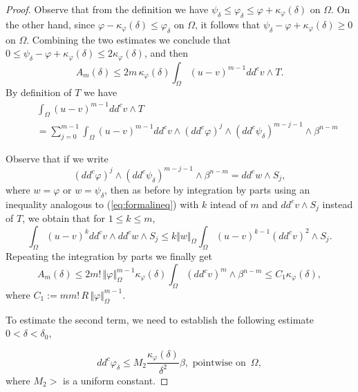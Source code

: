 \documentclass[12pt]{amsart}
\theoremstyle{definition}
\numberwithin{theorem}{section}
\numberwithin{equation}{section}
\begin{document}
{\begin{proof}
 Observe that from the definition we have  $\psi_\delta \leq \varphi_\delta  \leq \varphi + \kappa_\varphi (\delta)$ on $\Omega$. On the other hand, since $ \varphi - \kappa_\varphi (\delta) \leq \varphi_\delta$ on $\Omega$, it follows
that $ \psi_\delta - \varphi  + \kappa_\varphi  (\delta) \geq 0 $ on $\Omega$.  
Combining the two estimates  we conclude that  $0 \leq \psi_\delta - \varphi  + \kappa_\varphi  (\delta) \leq 2 \kappa_\varphi (\delta)$, and then 
$$
A_m (\delta) \leq 2 m \, \kappa_\varphi  (\delta)  \int_{\Omega}  (u - v)^{m-1} dd^c v \wedge T.
$$
By definition of $T$ we have  
\begin{eqnarray*}
&& \int_{\Omega}  (u - v)^{m-1} dd^c v \wedge T \\
 &&=   \sum_{j = 0}^{m -1} \int_{\Omega}  (u - v)^{m-1} dd^c v \wedge  (dd^c \varphi)^j \wedge (dd^c \psi_\delta)^{m-j-1} \wedge\beta^{n - m}
\end{eqnarray*}

Observe that  if we write 
$$
  (dd^c \varphi)^j \wedge (dd^c \psi_\delta)^{m-j-1} \wedge\beta^{n - m} = dd^c w \wedge S_j, 
  $$ 
  where $w = \varphi$ or $w = \psi_\delta$,  then as before by integration by parts  using an inequality analogous to (\ref {eq:formalineq}) with $k$ intead of $m$ and $ dd^c v \wedge S_j$ instead of $T$, we obtain that  for $1 \leq k \leq m$, 
$$
\int_{\Omega}  (u - v)^{k} dd^c v \wedge  dd^c w \wedge S_j \leq k  \Vert w \Vert_{\Omega} \int_{\Omega}  (u - v)^{k-1} (dd^c v)^2 \wedge S_j.
$$
Repeating the integration by parts we finally get
\begin{equation} \label{eq:estimateA}
A_m (\delta) \leq 2  m! \, \Vert \varphi \Vert_{\Omega}^{m -1} \kappa_\varphi  (\delta)  \int_{\Omega} (dd^c v)^m \wedge \beta^{n - m} \leq C_1 \kappa_\varphi  (\delta),
\end{equation}
where $C_1 :=  m m! \, R \, \Vert \varphi \Vert_{\Omega}^{m -1} $.

 To estimate the second term, we need to establish the following estimate $0 < \delta < \delta_0$,

\begin{equation} \label{eq:Festimate}
dd^c \varphi_\delta \leq M_2 \frac{\kappa_\varphi (\delta)}{\delta^2}  \beta, \, \, \text{pointwise on} \, \, \,  \Omega,
\end{equation}
where $M_2 > $ is a uniform constant.


\end{proof}}
\end{document}

